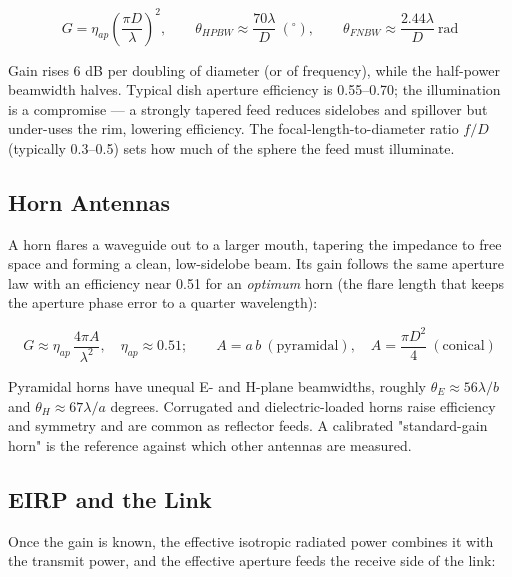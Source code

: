       
\[G = \eta_{ap}\left(\dfrac{\pi D}{\lambda}\right)^2,\qquad \theta_{HPBW}\approx\dfrac{70\lambda}{D}\ (^\circ),\qquad \theta_{FNBW}\approx\dfrac{2.44\lambda}{D}\ \text{rad}\]

      

Gain rises 6 dB per doubling of diameter (or of frequency), while the half-power beamwidth halves. Typical dish aperture efficiency is 0.55–0.70; the illumination is a compromise — a strongly tapered feed reduces sidelobes and spillover but under-uses the rim, lowering efficiency. The focal-length-to-diameter ratio $f/D$ (typically 0.3–0.5) sets how much of the sphere the feed must illuminate.

      

\subsection{Horn Antennas}

      

A horn flares a waveguide out to a larger mouth, tapering the impedance to free space and forming a clean, low-sidelobe beam. Its gain follows the same aperture law with an efficiency near 0.51 for an \emph{optimum} horn (the flare length that keeps the aperture phase error to a quarter wavelength):


      
\[G \approx \eta_{ap}\,\dfrac{4\pi A}{\lambda^2},\quad \eta_{ap}\approx0.51;\qquad A = a\,b\ (\text{pyramidal}),\quad A=\dfrac{\pi D^2}{4}\ (\text{conical})\]

      

Pyramidal horns have unequal E- and H-plane beamwidths, roughly $\theta_E\approx56\lambda/b$ and $\theta_H\approx67\lambda/a$ degrees. Corrugated and dielectric-loaded horns raise efficiency and symmetry and are common as reflector feeds. A calibrated "standard-gain horn" is the reference against which other antennas are measured.

      

\subsection{EIRP and the Link}

      

Once the gain is known, the effective isotropic radiated power combines it with the transmit power, and the effective aperture feeds the receive side of the link:

